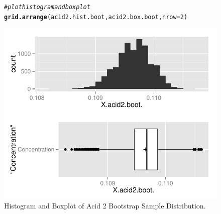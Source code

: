 \documentclass{article}\usepackage[]{graphicx}\usepackage[]{color}
\makeatletter
\def\maxwidth{ %
  \ifdim\Gin@nat@width>\linewidth
    \linewidth
  \else
    \Gin@nat@width
  \fi
}
\newcommand{\hlnum}[1]{\textcolor[rgb]{0.686,0.059,0.569}{#1}}%
\newcommand{\hlcom}[1]{\textcolor[rgb]{0.678,0.584,0.686}{\textit{#1}}}%
\newcommand{\hlstd}[1]{\textcolor[rgb]{0.345,0.345,0.345}{#1}}%
\newcommand{\hlkwc}[1]{\textcolor[rgb]{0.333,0.667,0.333}{#1}}%
\newcommand{\hlkwd}[1]{\textcolor[rgb]{0.737,0.353,0.396}{\textbf{#1}}}%
\newenvironment{kframe}{%
 \def\at@end@of@kframe{}%
 \ifinner\ifhmode%
  \def\at@end@of@kframe{\end{minipage}}%
  \begin{minipage}{\columnwidth}%
 \fi\fi%
 \def\FrameCommand##1{\hskip\@totalleftmargin \hskip-\fboxsep
 \colorbox{shadecolor}{##1}\hskip-\fboxsep
     \hskip-\linewidth \hskip-\@totalleftmargin \hskip\columnwidth}%
 \MakeFramed {\advance\hsize-\width
   \@totalleftmargin\z@ \linewidth\hsize
   \@setminipage}}%
 {\par\unskip\endMakeFramed%
 \at@end@of@kframe}
\newenvironment{knitrout}{}{} %
\makeatother
\begin{document}
\begin{figure}[H]  \begin{center} \vspace{-0.45in}
\begin{knitrout}
\color{fgcolor}\begin{kframe}
\begin{alltt}
\hlcom{# plot histogram and boxplot}
\hlkwd{grid.arrange}\hlstd{(acid2.hist.boot, acid2.box.boot,} \hlkwc{nrow} \hlstd{=} \hlnum{2}\hlstd{)}
\end{alltt}
\end{kframe}
\includegraphics[width=\maxwidth]{figure/2_acid2_bootbox_plot} 

\end{knitrout}
\end{center} \caption{Histogram and Boxplot of Acid 2 Bootstrap Sample Distribution.} \end{figure}
\end{document}
